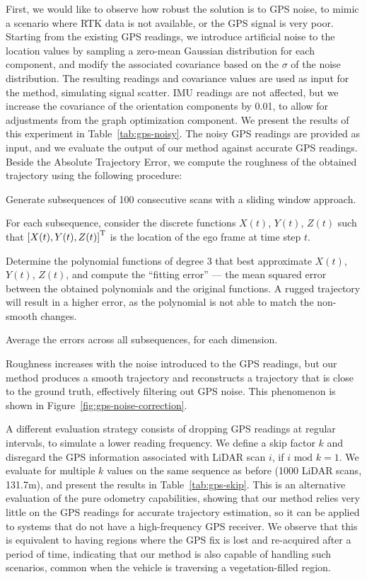 First, we would like to observe how robust the solution is to GPS noise, to mimic a scenario where RTK data is not available, or the GPS signal is very poor. Starting from the existing GPS readings, we introduce artificial noise to the location values by sampling a zero-mean Gaussian distribution for each component, and modify the associated covariance based on the $\sigma$ of the noise distribution. The resulting readings and covariance values are used as input for the method, simulating signal scatter. IMU readings are not affected, but we increase the covariance of the orientation components by 0.01, to allow for adjustments from the graph optimization component. We present the results of this experiment in Table~\ref{tab:gps-noisy}. The noisy GPS readings are provided as input, and we evaluate the output of our method against accurate GPS readings. Beside the Absolute Trajectory Error, we compute the roughness of the obtained trajectory using the following procedure:
\begin{compactenum}
    \item Generate subsequences of 100 consecutive scans with a sliding window approach.
    \item For each subsequence, consider the discrete functions $X(t)$, $Y(t)$, $Z(t)$ such that ${\left[X(t), Y(t), Z(t)\right]}^\text{T}$ is the location of the ego frame at time step $t$.
    \item Determine the polynomial functions of degree 3 that best approximate $X(t)$, $Y(t)$, $Z(t)$, and compute the ``fitting error'' --- the mean squared error between the obtained polynomials and the original functions. A rugged trajectory will result in a higher error, as the polynomial is not able to match the non-smooth changes.
    \item Average the errors across all subsequences, for each dimension.
\end{compactenum}
Roughness increases with the noise introduced to the GPS readings, but our method produces a smooth trajectory and reconstructs a trajectory that is close to the ground truth, effectively filtering out GPS noise. This phenomenon is shown in Figure~\ref{fig:gps-noise-correction}.

A different evaluation strategy consists of dropping GPS readings at regular intervals, to simulate a lower reading frequency. We define a skip factor $k$ and disregard the GPS information associated with LiDAR scan $i$, if $i \text{ mod } k =1$. We evaluate for multiple $k$ values on the same sequence as before (1000 LiDAR scans, 131.7m), and present the results in Table~\ref{tab:gps-skip}. This is an alternative evaluation of the pure odometry capabilities, showing that our method relies very little on the GPS readings for accurate trajectory estimation, so it can be applied to systems that do not have a high-frequency GPS receiver. We observe that this is equivalent to having regions where the GPS fix is lost and re-acquired after a period of time, indicating that our method is also capable of handling such scenarios, common when the vehicle is traversing a vegetation-filled region.

